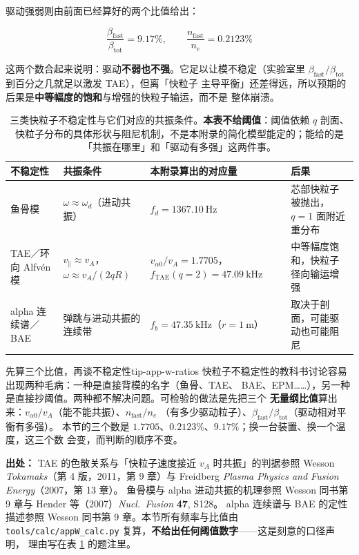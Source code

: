 驱动强弱则由前面已经算好的两个比值给出：

\begin{equation}
\frac{\beta_{\text{fast}}}{\beta_{\text{tot}}} = 9.17\%,
\qquad
\frac{n_{\text{fast}}}{n_e} = 0.2123\%
\label{eq:app-w-ratios}
\end{equation}

这两个数合起来说明：驱动\textbf{不弱也不强}。它足以让模不稳定（实验室里
$\beta_{\text{fast}}/\beta_{\text{tot}}$ 到百分之几就足以激发 TAE），但离「快粒子
主导平衡」还差得远，所以预期的后果是\textbf{中等幅度的饱和}与增强的快粒子输运，而不是
整体崩溃。

\begin{table}[htbp]
\centering
\caption{三类快粒子不稳定性与它们对应的共振条件。\textbf{本表不给阈值}：阈值依赖
$q$ 剖面、快粒子分布的具体形状与阻尼机制，不是本附录的简化模型能定的；能给的是
「共振在哪里」和「驱动有多强」这两件事。}
\label{tab:app-w-instability}
\begin{tabular}{@{}p{2.5cm}p{2.4cm}p{3.1cm}p{3.6cm}@{}}
\hline
不稳定性 & 共振条件 & 本附录算出的对应量 & 后果 \\
\hline
鱼骨模 & $\omega\approx\omega_d$（进动共振） &
$f_d=1367.10\ \mathrm{Hz}$ & 芯部快粒子被抛出，$q=1$ 面附近重分布 \\
TAE／环向 Alfvén 模 & $v_\parallel\approx v_A$，$\omega\approx v_A/(2qR)$ &
$v_{\alpha 0}/v_A=1.7705$，$f_{\text{TAE}}(q{=}2)=47.09\ \mathrm{kHz}$ &
中等幅度饱和，快粒子径向输运增强 \\
alpha 连续谱／BAE & 弹跳与进动共振的连续带 &
$f_b=47.35\ \mathrm{kHz}$（$r=1\ \mathrm{m}$） &
取决于剖面，可能驱动也可能阻尼 \\
\hline
\end{tabular}

\end{table}

\begin{tip}{先算三个比值，再谈不稳定性}{tip-app-w-ratios}
快粒子不稳定性的教科书讨论容易出现两种毛病：一种是直接背模的名字（鱼骨、TAE、
BAE、EPM……），另一种是直接抄阈值。两种都不解决问题。可检验的做法是先把三个
\textbf{无量纲比值}算出来：$v_{\alpha 0}/v_A$（能不能共振）、$n_{\text{fast}}/n_e$
（有多少驱动粒子）、$\beta_{\text{fast}}/\beta_{\text{tot}}$（驱动相对平衡有多强）。
本节的三个数是 $1.7705$、$0.2123\%$、$9.17\%$；换一台装置、换一个温度，这三个数
会变，而判断的顺序不变。
\end{tip}

{\footnotesize
\textbf{出处：} TAE 的色散关系与「快粒子速度接近 $v_A$ 时共振」的判据参照
Wesson \textit{Tokamaks}（第 4 版，2011，第 9 章）与 Freidberg \textit{Plasma
Physics and Fusion Energy}（2007，第 13 章）。
鱼骨模与 alpha 进动共振的机理参照
Wesson 同书第 9 章与 Hender 等（2007）\textit{Nucl.\ Fusion} \textbf{47}, S128。
alpha 连续谱与 BAE 的定性描述参照 Wesson 同书第 9 章。本节所有频率与比值由
\texttt{tools/\allowbreak{}calc/\allowbreak{}appW\_calc.py} 复算，\textbf{不给出任何阈值数字}——这是刻意的口径声明，
理由写在表 \ref{tab:app-w-instability} 的题注里。
}

